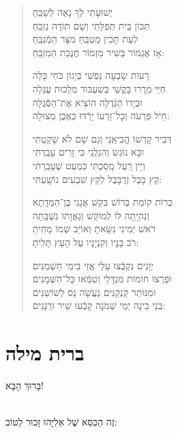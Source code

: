 \documentclass[twoside, openany, parskip=half, 11pt]{book}
\begin{document}
\begin{quote}
 יְשׁוּעָתִי \hfill לְךָ נָאֶה לְשַׁבֵּֽחַ \\ 	תִּכּוֹן בֵּית תְּפִלָּתִי \hfill וְשָׁם תּוֹדָה נְזַבֵּֽחַ \\
לְעֵת תָּכִין מַטְבֵּֽחַ \hfill מִצָּר הַמְֿנַבֵּֽחַ \\	אָז אֶגְמוֹר בְּשִׁיר מִזְמוֹר \hfill חֲנֻכַּת הַמִּזְבֵּֽחַ:

רָעוֹת שָׂבְעָה נַפְשִׁי \hfill בְּיָגוֹן כֹּחִי כָּלָה \\	חַיַּי מֵרֲרוּ בָּקֳשִׁי \hfill בְּשִׁעְבּוּד מַלְכוּת עֶגְלָה \\
וּבְיָדוֹ הַגְּֿדֻלָּה \hfill הוֹצִיא אֶת־הַסְּֿגֻלָּה \\	חֵיל פַּרְעֹה וְכָל־זַרְעוֹ \hfill יָרְֿדוּ כְּאֶֽבֶן מְצוּלָה:

דְּבִיר קָדְשׁוֹ הֱבִיאַֽנִי \hfill וְגַם שָׁם לֹא שָׁקַֽטְתִּי \\	וּבָא נוֹגֵשׂ וְהִגְלַֽנִי \hfill כִּי זָרִים עָבַֽדְתִּי \\
וְיֵין רַֽעַל מָֽסַכְתִּי \hfill כִּמְעַט שֶׁעָבַֽרְתִּי \\	קֵץ בָּבֶל זְרֻבָּבֶל \hfill לְקֵץ שִׁבְעִים נוֹשָֽׁעְתִּי:

כְּרוֹת קוֹמַת בְּרוֹשׁ בִּקֵּשׁ \hfill אֲגָגִי בֶּן־הַמְּדָֽתָא \\ 	וְנִהְיָֽתָה לּוֹ לְמוֹקֵשׁ \hfill וְגַאֲוָתוֹ נִשְׁבָּֽתָה \\
רֹאשׁ יְמִינִי נִשֵּֽׂאתָ \hfill וְאוֹיֵב שְׁמוֹ מָחִֽיתָ \\	רֹב בָּנָיו וְקִנְיָנָיו \hfill עַל הָעֵץ תָּלִֽיתָ:

יְוָנִים נִקְבְּֿצוּ עָלַי \hfill אֲזַי בִּימֵי חַשְׁמַנִּים \\	וּפָרְצוּ חוֹמוֹת מִגְדָּלַי \hfill וְטִמְּֿאוּ כָּל־הַשְּׁמָנִים \\
וּמִנּוֹתַר קַנְקַנִּים \hfill נַעֲשָׂה נֵס לְשׁוֹשַׁנִּים \\	בְּנֵי בִינָה יְמֵי שְׁמֹנָה \hfill קָבְֿעוּ שִׁיר וּרְנָנִים:

\end{quote}

\vfill
\sepline

\chapter[ברית מילה]{ ברית מילה }

\begin{Large}
בָּרוּךְ הַבָּא!

\end{Large}

\\
זֶה הַכִּסֵּא שֶׁל אֵלִיָּהוּ זָכוּר לַטּוֹב:
\end{document}
